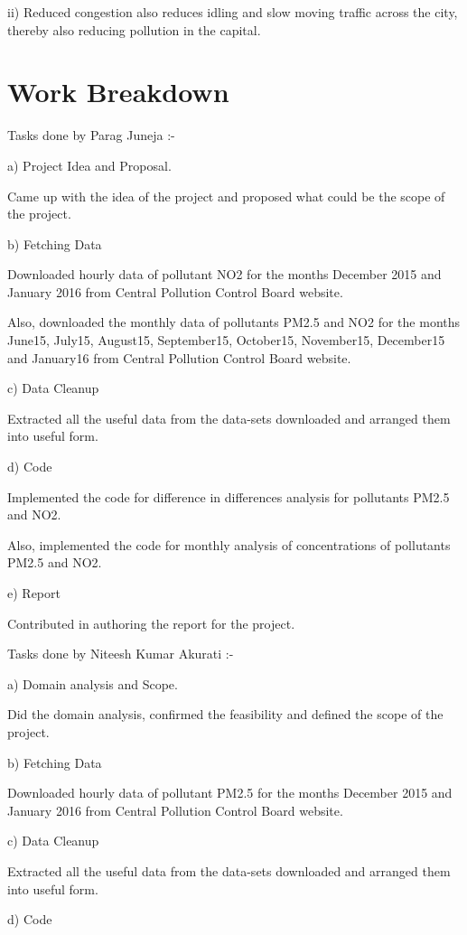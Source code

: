 \documentclass{report}
\begin{document}
ii) Reduced congestion also reduces idling and slow moving traffic across the city, thereby also reducing pollution in the capital.

\section{Work Breakdown}

Tasks done by Parag Juneja :-

a) Project Idea and Proposal.

   Came up with the idea of the project and proposed what could be the scope of the project.
   
b) Fetching Data
 
   Downloaded hourly data of pollutant NO2 for the months December 2015 and January 2016 from Central Pollution Control Board website.
   
   Also, downloaded the monthly data of pollutants PM2.5 and NO2 for the months June15, July15, August15, September15, October15, November15, December15 and January16 from Central Pollution Control Board website.
 
c) Data Cleanup

   Extracted all the useful data from the data-sets downloaded and arranged them into useful form.
  
d) Code

   Implemented the code for difference in differences analysis for pollutants PM2.5 and NO2.
   
   Also, implemented the code for monthly analysis of concentrations of pollutants PM2.5 and NO2.
   
e) Report

   Contributed in authoring the report for the project.
   

Tasks done by Niteesh Kumar Akurati :- 

a) Domain analysis and Scope.

   Did the domain analysis, confirmed the feasibility and defined the scope of the project.
   
b) Fetching Data
 
   Downloaded hourly data of pollutant PM2.5 for the months December 2015 and January 2016 from Central Pollution Control Board website.
    
c) Data Cleanup

   Extracted all the useful data from the data-sets downloaded and arranged them into useful form.
  
d) Code
\end{document}
